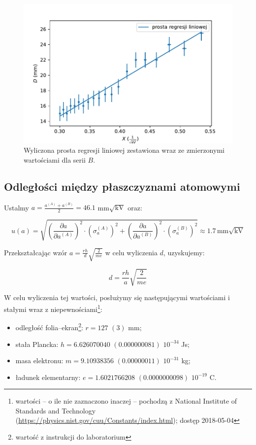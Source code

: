 \documentclass[a4paper]{article}
\newlength{\du}
\begin{document}
\begin{figure}[h]
\centering
\includegraphics[scale=0.7]{wykres_B.pdf}
\caption{Wyliczona prosta regresji liniowej zestawiona wraz ze zmierzonymi wartościami dla serii $B$.}
\label{wykres_B}
\end{figure}

\subsection{Odległości między płaszczyznami atomowymi}

Ustalmy $a = \frac{a^{(A)} + a^{(B)}}{2}= 46.1$ mm$\sqrt{\text{kV}}$ oraz:

$$u(a) = \sqrt{\left( \frac{\partial a}{\partial a^{(A)}} \right)^2 \cdot \left(\sigma_a^{(A)}\right)^2 + \left( \frac{\partial a}{\partial a^{(B)}} \right)^2 \cdot \left(\sigma_a^{(B)}\right)^2 } \approx 1.7 \, \text{mm}\sqrt{\text{kV}}$$

Przekształcając wzór $a = \frac{rh}{d} \sqrt{\frac{2}{me}}$ w celu wyliczenia $d$, uzyskujemy:

$$d = \frac{rh}{a} \sqrt{\frac{2}{me}}$$

W celu wyliczenia tej wartości, posłużymy się następującymi wartościami i stałymi wraz z niepewnościami\footnote{wartości -- o ile nie zaznaczono inaczej -- pochodzą z National Institute of Standards and Technology (\url{https://physics.nist.gov/cuu/Constants/index.html}); dostęp 2018-05-04}:

\begin{itemize}
	\item odległość folia--ekran\footnote{wartość z instrukcji do laboratorium}: $r = 127$ $(3)$ mm;
	\item stała Plancka: $h = 6.626 070 040$ $(0.000 000 081)$ $10^{-34}$ Js;
	\item masa elektronu: $m = 9.109 383 56$ $(0.000 000 11)$ $10^{-31}$ kg;
	\item ładunek elementarny: $e = 1.602 176 6208$ $(0.000 000 0098)$ $10^{-19}$ C.
\end{itemize}
\end{document}
